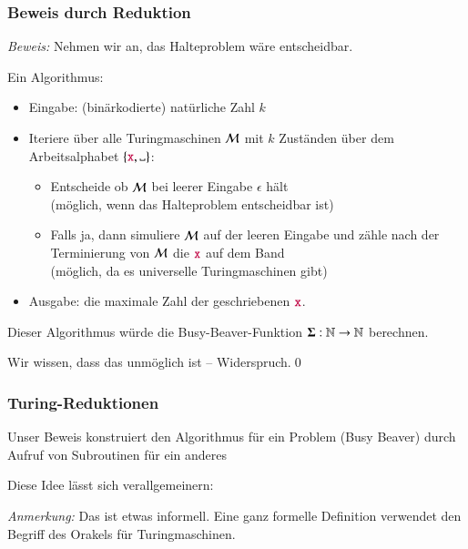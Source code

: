 \documentclass[onlymath]{beamer}
\begin{document}
\begin{frame}[t]\frametitle{Beweis durch Reduktion\phantom{"`T"'}}

\pause

\emph{Beweis:} Nehmen wir an, das Halteproblem wäre entscheidbar.\medskip\pause

Ein Algorithmus:
\begin{itemize}
\item Eingabe: (binärkodierte) natürliche Zahl $k$
\item Iteriere über alle Turingmaschinen $\mathcal{M}$ mit $k$ Zuständen über dem Arbeitsalphabet $\{\Sterm{x},\blank\}$:
\begin{itemize}
\item Entscheide ob $\mathcal{M}$ bei leerer Eingabe $\epsilon$ hält\\
{\footnotesize\textcolor{devilscss}{(möglich, wenn das Halteproblem entscheidbar ist)}}
\item Falls ja, dann simuliere $\mathcal{M}$ auf der leeren Eingabe und zähle
		nach der Terminierung von $\mathcal{M}$ die $\mathtt{\textcolor{purple}{x}}$ auf dem Band\\
{\footnotesize\textcolor{devilscss}{(möglich, da es universelle Turingmaschinen gibt)}}
\end{itemize}
\item Ausgabe: die maximale Zahl der geschriebenen $\mathtt{\textcolor{purple}{x}}$.
\end{itemize}\pause
Dieser Algorithmus würde die Busy-Beaver-Funktion $\boldsymbol{\Sigma}:\mathbb{N}\to\mathbb{N}$
berechnen.\medskip

Wir wissen, dass das unmöglich ist -- Widerspruch.\qed

\end{frame}

\begin{frame}\frametitle{Turing-Reduktionen}

Unser Beweis konstruiert den Algorithmus für ein Problem (Busy Beaver)
durch Aufruf von Subroutinen für ein anderes 
\bigskip\pause

Diese Idee lässt sich verallgemeinern:


{\footnotesize
\emph{Anmerkung:} Das ist etwas informell. Eine ganz formelle Definition verwendet den Begriff des \alert{Orakels} für Turingmaschinen.
}\medskip\pause


\end{frame}
\end{document}
